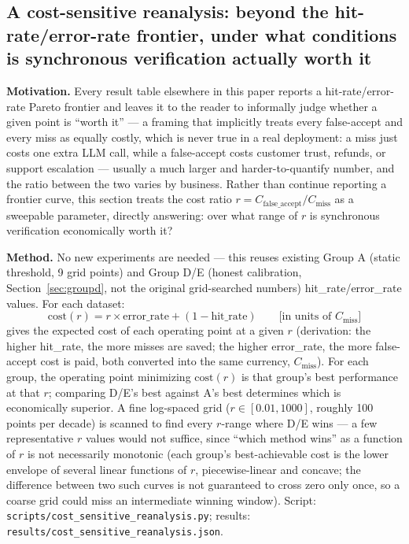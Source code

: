 \documentclass[11pt]{article}
\begin{document}
\subsection{A cost-sensitive reanalysis: beyond the hit-rate/error-rate frontier, under what conditions is synchronous verification actually worth it}
\label{sec:costsensitive}

\textbf{Motivation.} Every result table elsewhere in this paper reports a hit-rate/error-rate Pareto frontier and leaves it to the reader to informally judge whether a given point is ``worth it'' --- a framing that implicitly treats every false-accept and every miss as equally costly, which is never true in a real deployment: a miss just costs one extra LLM call, while a false-accept costs customer trust, refunds, or support escalation --- usually a much larger and harder-to-quantify number, and the ratio between the two varies by business. Rather than continue reporting a frontier curve, this section treats the cost ratio $r = C_{\text{false\_accept}} / C_{\text{miss}}$ as a sweepable parameter, directly answering: over what range of $r$ is synchronous verification economically worth it?

\textbf{Method.} No new experiments are needed --- this reuses existing Group A (static threshold, 9 grid points) and Group D/E (honest calibration, Section~\ref{sec:groupd}, not the original grid-searched numbers) hit\_rate/error\_rate values. For each dataset:
\[
\mathrm{cost}(r) = r \times \mathrm{error\_rate} + (1 - \mathrm{hit\_rate}) \qquad \text{[in units of } C_{\text{miss}}\text{]}
\]
gives the expected cost of each operating point at a given $r$ (derivation: the higher hit\_rate, the more misses are saved; the higher error\_rate, the more false-accept cost is paid, both converted into the same currency, $C_{\text{miss}}$). For each group, the operating point minimizing $\mathrm{cost}(r)$ is that group's best performance at that $r$; comparing D/E's best against A's best determines which is economically superior. A fine log-spaced grid ($r \in [0.01, 1000]$, roughly 100 points per decade) is scanned to find every $r$-range where D/E wins --- a few representative $r$ values would not suffice, since ``which method wins'' as a function of $r$ is not necessarily monotonic (each group's best-achievable cost is the lower envelope of several linear functions of $r$, piecewise-linear and concave; the difference between two such curves is not guaranteed to cross zero only once, so a coarse grid could miss an intermediate winning window). Script: \texttt{scripts/\allowbreak{}cost\_\allowbreak{}sensitive\_\allowbreak{}reanalysis.\allowbreak{}py}; results: \texttt{results/\allowbreak{}cost\_\allowbreak{}sensitive\_\allowbreak{}reanalysis.\allowbreak{}json}.
\end{document}
